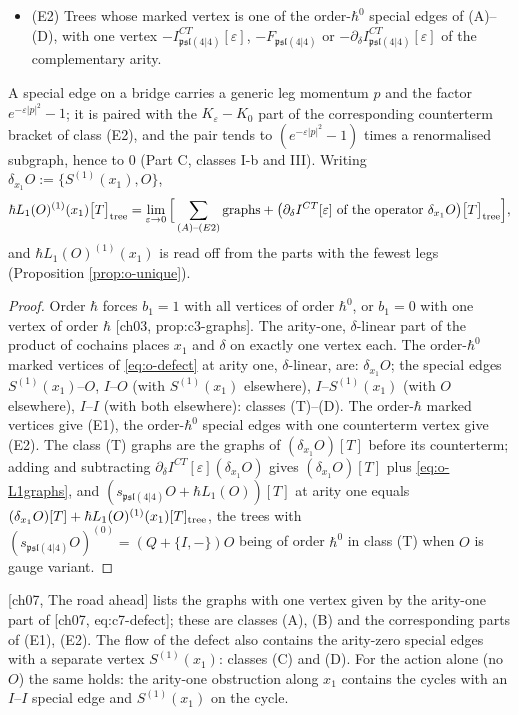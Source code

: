\begin{theorem}
\begin{itemize}
\item (E2) Trees whose marked vertex is one of the order-$\hbar^0$ special edges of (A)--(D), with one vertex $-I^{CT}_{\mathfrak{psl}(4|4)}[\varepsilon]$, $-F_{\mathfrak{psl}(4|4)}$ or $-\partial_\delta I^{CT}_{\mathfrak{psl}(4|4)}[\varepsilon]$ of the complementary arity.
\end{itemize}
A special edge on a bridge carries a generic leg momentum $p$ and the factor $e^{-\varepsilon|p|^2}-1$; it is paired with the $K_\varepsilon-K_0$ part of the corresponding counterterm bracket of class (E2), and the pair tends to $(e^{-\varepsilon|p|^2}-1)$ times a renormalised subgraph, hence to $0$ (Part C, classes I-b and III). Writing $\delta_{x_1}O:=\{S^{(1)}(x_1),O\}$,
\begin{equation}
\hbar L_1(O)^{(1)}(x_1)\big[T\big]_{\rm tree}=\lim_{\varepsilon\to0}\Big[\sum_{(A)\text{--}(E2)}\text{graphs}+\big(\partial_\delta I^{CT}[\varepsilon]\ \text{of the operator }\delta_{x_1}O\big)\big[T\big]_{\rm tree}\Big],
\label{eq:o-L1graphs}
\end{equation}
and $\hbar L_1(O)^{(1)}(x_1)$ is read off from the parts with the fewest legs (Proposition \ref{prop:o-unique}).
\end{theorem}

\begin{proof}
Order $\hbar$ forces $b_1=1$ with all vertices of order $\hbar^0$, or $b_1=0$ with one vertex of order $\hbar$ [ch03, prop:c3-graphs]. The arity-one, $\delta$-linear part of the product of cochains places $x_1$ and $\delta$ on exactly one vertex each. The order-$\hbar^0$ marked vertices of \eqref{eq:o-defect} at arity one, $\delta$-linear, are: $\delta_{x_1}O$; the special edges $S^{(1)}(x_1)$--$O$, $I$--$O$ (with $S^{(1)}(x_1)$ elsewhere), $I$--$S^{(1)}(x_1)$ (with $O$ elsewhere), $I$--$I$ (with both elsewhere): classes (T)--(D). The order-$\hbar$ marked vertices give (E1), the order-$\hbar^0$ special edges with one counterterm vertex give (E2). The class (T) graphs are the graphs of $(\delta_{x_1}O)[T]$ before its counterterm; adding and subtracting $\partial_\delta I^{CT}[\varepsilon](\delta_{x_1}O)$ gives $(\delta_{x_1}O)[T]$ plus \eqref{eq:o-L1graphs}, and $(s_{\mathfrak{psl}(4|4)}O+\hbar L_1(O))[T]$ at arity one equals $(\delta_{x_1}O)[T]+\hbar L_1(O)^{(1)}(x_1)[T]_{\rm tree}$, the trees with $(s_{\mathfrak{psl}(4|4)}O)^{(0)}=(Q+\{I,-\})O$ being of order $\hbar^0$ in class (T) when $O$ is gauge variant.
\end{proof}

\begin{remark}
\label{rem:o-roadahead}
[ch07, The road ahead] lists the graphs with one vertex given by the arity-one part of [ch07, eq:c7-defect]; these are classes (A), (B) and the corresponding parts of (E1), (E2). The flow of the defect also contains the arity-zero special edges with a separate vertex $S^{(1)}(x_1)$: classes (C) and (D). For the action alone (no $O$) the same holds: the arity-one obstruction along $x_1$ contains the cycles with an $I$--$I$ special edge and $S^{(1)}(x_1)$ on the cycle.
\end{remark}


